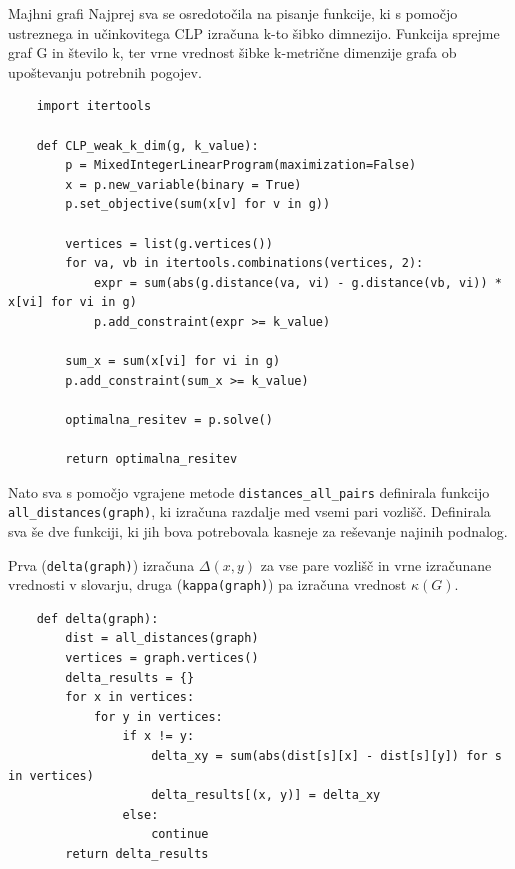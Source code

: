\documentclass[12pt,a4paper]{amsart}
\makeatletter
\renewcommand\section{\@startsection{section}{1}%
  \z@{.5\linespacing\@plus.7\linespacing}{.5\linespacing}%
  {\normalfont\scshape\large\centering}}
\theoremstyle{plain} %
\makeatother
\begin{document}
\section{Majhni grafi}
Najprej sva se osredotočila na pisanje funkcije, ki s pomočjo ustreznega in učinkovitega CLP izračuna
k-to šibko dimnezijo. Funkcija sprejme graf G in število k, ter vrne vrednost šibke k-metrične dimenzije grafa
ob upoštevanju potrebnih pogojev.
\bigskip 
\begin{small}
    \begin{lstlisting}
    import itertools

    def CLP_weak_k_dim(g, k_value):
        p = MixedIntegerLinearProgram(maximization=False)
        x = p.new_variable(binary = True)
        p.set_objective(sum(x[v] for v in g))

        vertices = list(g.vertices())
        for va, vb in itertools.combinations(vertices, 2):
            expr = sum(abs(g.distance(va, vi) - g.distance(vb, vi)) * x[vi] for vi in g)
            p.add_constraint(expr >= k_value)

        sum_x = sum(x[vi] for vi in g)
        p.add_constraint(sum_x >= k_value)

        optimalna_resitev = p.solve()

        return optimalna_resitev
    \end{lstlisting}
\end{small}
\bigskip

Nato sva s pomočjo vgrajene metode \verb|distances_all_pairs| definirala funkcijo \verb|all_distances(graph)|, ki izračuna 
razdalje med vsemi pari vozlišč. 
Definirala sva še dve funkciji, ki jih bova potrebovala kasneje za reševanje najinih podnalog. 

Prva (\verb|delta(graph)|) izračuna $\Delta(x,y)$ za vse pare vozlišč in vrne izračunane vrednosti v slovarju,
druga (\verb|kappa(graph)|) pa izračuna vrednost $\kappa(G)$.

\begin{lstlisting}
    def delta(graph):
        dist = all_distances(graph)
        vertices = graph.vertices()
        delta_results = {}
        for x in vertices:
            for y in vertices:
                if x != y:
                    delta_xy = sum(abs(dist[s][x] - dist[s][y]) for s in vertices)
                    delta_results[(x, y)] = delta_xy
                else:
                    continue
        return delta_results
\end{lstlisting}
\end{document}
